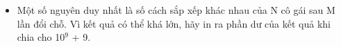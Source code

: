 \begin{itemize}
	\item Một số nguyên duy nhất là số cách sắp xếp khác nhau của N cô gái sau M lần đổi chỗ. Vì kết quả có thể khá lớn, hãy in ra phần dư của kết quả khi chia cho 10$^9$ + 9. 
\end{itemize}